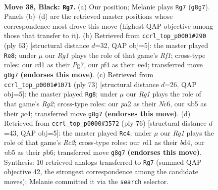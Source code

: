 \documentclass[11pt]{article}
\begin{document}
\clearpage

\begin{figure}[p]\centering
\begin{subfigure}{0.46\textwidth}\centering
\resizebox{\linewidth}{!}{%
\newchessgame
\chessboard[
  setfen={4k1r1/1p2p2p/n5p1/pNp5/5P1P/2P2P2/P5K1/n1BR4 b - - 2 38},
  showmover=false,
  pgfstyle=straightmove, color=movearrow, markmove={g8-g7}
]}
\caption{}
\end{subfigure}\hfill
\begin{subfigure}{0.46\textwidth}\centering
\resizebox{\linewidth}{!}{%
\newchessgame
\chessboard[
  setfen={5r1k/2p2ppp/1n6/1p6/1p1PN3/1P5P/5PP1/2R3K1 b - - 2 32},
  showmover=false,
  pgfstyle=straightmove, color=movearrow, markmove={f8-e8}
]}
\caption{}
\end{subfigure}
\\[4pt]
\begin{subfigure}{0.46\textwidth}\centering
\resizebox{\linewidth}{!}{%
\newchessgame
\chessboard[
  setfen={8/p1k3rp/2n1p1p1/2p2p2/2P2P1P/P2R4/3P1KPN/8 b - - 4 37},
  showmover=false,
  pgfstyle=straightmove, color=movearrow, markmove={g7-g8}
]}
\caption{}
\end{subfigure}\hfill
\begin{subfigure}{0.46\textwidth}\centering
\resizebox{\linewidth}{!}{%
\newchessgame
\chessboard[
  setfen={3k4/r4p2/1pP1p3/6p1/1P1bP2p/3N1P1P/2R1K3/8 w - - 1 39},
  showmover=false,
  pgfstyle=straightmove, color=movearrow, markmove={c2-c4}
]}
\caption{}
\end{subfigure}
\caption{\textbf{Move 38, Black: \texttt{Rg7}.} (a) Our position; Melanie plays \texttt{Rg7} (\texttt{g8g7}). Panels (b)--(d) are the retrieved master positions whose correspondence most drove this move (highest QAP objective among those that transfer to it). (b) Retrieved from \texttt{ccrl\_top\_p0001\#290} (ply 63) [structural distance $d$=32, QAP obj=5]: the master played \texttt{Re8}; under $\mu$ our \emph{Rg1} plays the role of that game's \emph{Rf1}; cross-type roles: our \emph{r}d1 as their \emph{P}g7, our \emph{p}f4 as their \emph{n}e4; transferred move \texttt{g8g7} \textbf{(endorses this move)}. (c) Retrieved from \texttt{ccrl\_top\_p0001\#1071} (ply 73) [structural distance $d$=26, QAP obj=5]: the master played \texttt{Rg8}; under $\mu$ our \emph{Rg1} plays the role of that game's \emph{Rg2}; cross-type roles: our \emph{p}a2 as their \emph{N}c6, our \emph{n}b5 as their \emph{p}c4; transferred move \texttt{g8g7} \textbf{(endorses this move)}. (d) Retrieved from \texttt{ccrl\_top\_p0000\#3572} (ply 76) [structural distance $d$=43, QAP obj=5]: the master played \texttt{Rc4}; under $\mu$ our \emph{Rg1} plays the role of that game's \emph{Rc2}; cross-type roles: our \emph{r}d1 as their \emph{b}d4, our \emph{n}b5 as their \emph{p}b6; transferred move \texttt{g8g7} \textbf{(endorses this move)}. Synthesis: 10 retrieved analogs transferred to \texttt{Rg7} (summed QAP objective 42, the strongest correspondence among the candidate moves); Melanie committed it via the \texttt{search} selector.}
\label{fig:thought-m75}
\end{figure}
\end{document}
